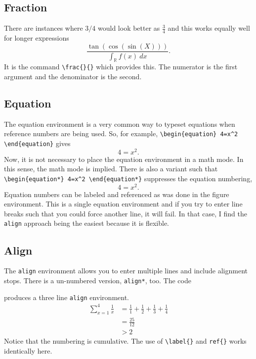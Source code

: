 \subsection*{Fraction}
There are instances where $3/4$ would look better as $\frac{3}{4}$ and
this works equally well for longer expressions $$
\frac{\tan\left(\cos\left(\sin (X) \right)\right)}{\int_{\mathbb{R}}
  f(x) ~ dx}.$$ It is the command \verb!\frac{}{}! which provides
this. The numerator is the first argument and the denominator is the
second.
\subsection*{Equation}
The equation environment is a very common way to typeset equations
when reference numbers are being used. So, for example,
\verb!\begin{equation} 4=x^2 \end{equation}! gives
\begin{equation}
  4=x^2.
\end{equation}
Now, it is not necessary to place the equation environment in a math
mode. In this sense, the math mode is implied. There is also a variant
such that \verb!\begin{equation*} 4=x^2 \end{equation*}! suppresses
the equation numbering,
\begin{equation*}
  4=x^2.
\end{equation*}
Equation numbers can be labeled and referenced as was done in the
figure environment. This is a single equation environment and if you
try to enter line breaks such that you could force another line, it
will fail. In that case, I find the \texttt{align} approach being the
easiest because it is flexible.

\subsection*{Align}
The \texttt{align} environment allows you to enter multiple lines and
include alignment stops. There is a un-numbered version,
\texttt{align*}, too. The code

produces a three line \texttt{align} environment.
\begin{align}
   \sum_{x=1}^{4} \frac{1}{x}
   &= \frac{1}{1} + \frac{1}{2}  + \frac{1}{3} + \frac{1}{4} \\
   &= \frac{25}{12} \\
   &>2
\end{align}
Notice that the numbering is cumulative. The use of \verb!\label{}!
and \verb!ref{}! works identically here.


